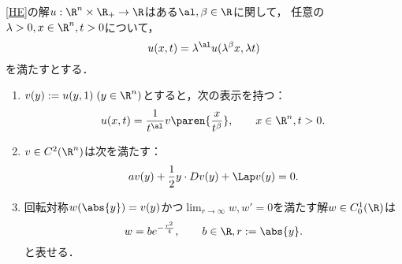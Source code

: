 \documentclass[uplatex,dvipdfmx]{jsreport}
\begin{document}
\begin{lemma}[相似変換不変で回転対称で有界な解としてのGauss核]
    \ref{HE}の解$u:\R^n\times\R_+\to\R$はある$\al,\beta\in\R$に関して，
    任意の$\lambda>0,x\in\R^n,t>0$について，
    \[u(x,t)=\lambda^\al u(\lambda^\beta x,\lambda t)\]
    を満たすとする．
    \begin{enumerate}
        \item $v(y):=u(y,1)\;(y\in\R^n)$とすると，次の表示を持つ：
        \[u(x,t)=\frac{1}{t^\al}v\paren{\frac{x}{t^\beta}},\qquad x\in\R^n,t>0.\]
        \item $v\in C^2(\R^n)$は次を満たす：
        \[av(y)+\frac{1}{2}y\cdot Dv(y)+\Lap v(y)=0.\]
        \item 回転対称$w(\abs{y})=v(y)$かつ$\lim_{r\to\infty}w,w'=0$を満たす解$w\in C^1_0(\R)$は
        \[w=be^{-\frac{r^2}{4}},\qquad b\in\R,r:=\abs{y}.\]
        と表せる．
    \end{enumerate}
\end{lemma}
\end{document}
